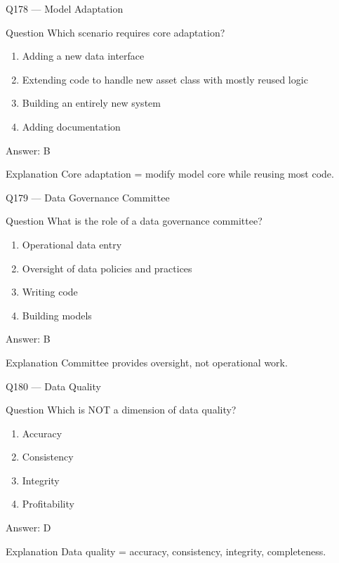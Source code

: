 \documentclass[aspectratio=169,8pt]{beamer}
\begin{document}
	\begin{frame}{Q178 --- Model Adaptation}
		\begin{block}{Question}
			Which scenario requires core adaptation?
		\end{block}
		\begin{enumerate}
			\item Adding a new data interface
			\item Extending code to handle new asset class with mostly reused logic
			\item Building an entirely new system
			\item Adding documentation
		\end{enumerate}
		\begin{exampleblock}{Answer: B}\end{exampleblock}
		\begin{block}{Explanation}
			Core adaptation = modify model core while reusing most code.
		\end{block}
	\end{frame}
	
	\begin{frame}{Q179 --- Data Governance Committee}
		\begin{block}{Question}
			What is the role of a data governance committee?
		\end{block}
		\begin{enumerate}
			\item Operational data entry
			\item Oversight of data policies and practices
			\item Writing code
			\item Building models
		\end{enumerate}
		\begin{exampleblock}{Answer: B}\end{exampleblock}
		\begin{block}{Explanation}
			Committee provides oversight, not operational work.
		\end{block}
	\end{frame}
	
	\begin{frame}{Q180 --- Data Quality}
		\begin{block}{Question}
			Which is NOT a dimension of data quality?
		\end{block}
		\begin{enumerate}
			\item Accuracy
			\item Consistency
			\item Integrity
			\item Profitability
		\end{enumerate}
		\begin{exampleblock}{Answer: D}\end{exampleblock}
		\begin{block}{Explanation}
			Data quality = accuracy, consistency, integrity, completeness.
		\end{block}
	\end{frame}
	
\end{document}
